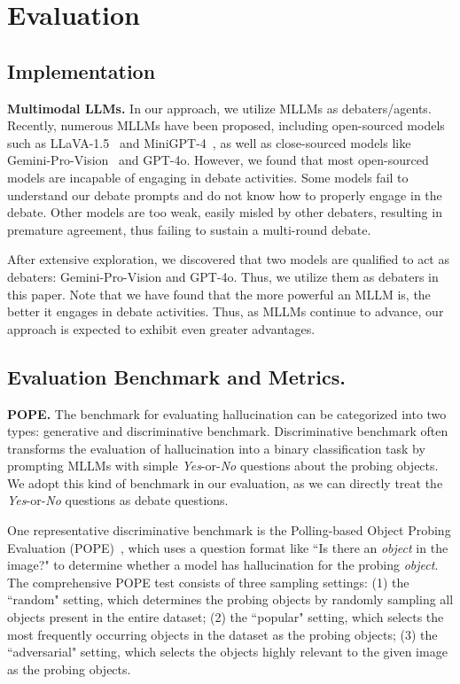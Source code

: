 \documentclass[10pt,twocolumn,letterpaper]{article}
\begin{document}
\section{Evaluation}
\subsection{Implementation}
\noindent\textbf{Multimodal LLMs.} 
In our approach, we utilize MLLMs as debaters/agents. Recently, numerous MLLMs have been proposed, including 
open-sourced models such as LLaVA-1.5~\cite{liu2024improved} and MiniGPT-4~\cite{zhu2023minigpt}, as well as close-sourced models like Gemini-Pro-Vision~\cite{team2023gemini} and GPT-4o. 
However, we found that most open-sourced models are incapable of engaging in debate activities.
Some models fail to understand our debate prompts and do not know how to properly engage in the debate. Other models are too weak, easily misled by other debaters, resulting in premature agreement, thus failing to sustain a multi-round debate.

After extensive exploration, we discovered that two models are qualified to act as debaters: Gemini-Pro-Vision and GPT-4o. Thus, we utilize them as debaters in this paper. 
Note that we have found that the more powerful an MLLM is, the better it engages in debate activities. Thus, as MLLMs continue to advance, our approach is expected to exhibit even greater advantages.

\subsection{Evaluation Benchmark and Metrics.}
\noindent\textbf{POPE.} 
The benchmark for evaluating hallucination can be categorized into two types: generative and discriminative benchmark. Discriminative benchmark often transforms the evaluation of hallucination into a binary classification task by prompting MLLMs with simple \emph{Yes}-or-\emph{No} questions about the probing objects. We adopt this kind of benchmark in our evaluation, as we can directly treat the \emph{Yes}-or-\emph{No} questions as debate questions.

One representative discriminative benchmark is the Polling-based Object Probing Evaluation (POPE)~\cite{li2023evaluating}, which uses a question format like ``Is there an \emph{object} in the image?" to determine whether a model has hallucination for the probing \emph{object}. The comprehensive POPE test consists of three sampling settings: (1) the ``random" setting, which determines the probing objects by randomly sampling all objects present in the entire dataset; (2) the ``popular" setting, which selects the most frequently occurring objects in the dataset as the probing objects; (3) the ``adversarial" setting, which selects the objects highly relevant to the given image as the probing objects.
\end{document}
